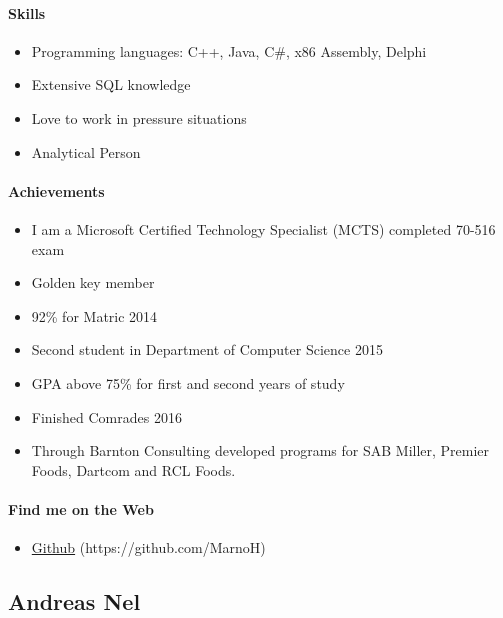 \documentclass{article}
\begin{document}
        \paragraph{Skills}
            \begin{itemize}
                \item Programming languages: C++, Java, C\#, x86 Assembly, Delphi
                \item Extensive SQL knowledge
                \item Love to work in pressure situations
                \item Analytical Person
            \end{itemize}
            
        \paragraph{Achievements}
            \begin{itemize}
                \item I am a Microsoft Certified Technology Specialist (MCTS) completed 70-516 exam
                \item Golden key member
                \item 92\% for Matric 2014
                \item Second student in Department of Computer Science 2015
                \item GPA above 75\% for first and second years of study
                \item Finished Comrades 2016
                \item Through Barnton Consulting developed programs for SAB Miller, Premier Foods, Dartcom and RCL Foods.
            \end{itemize}
            
        \paragraph{Find me on the Web}
            \begin{itemize}
                \item \href{https://github.com/MarnoH}{Github} (https://github.com/MarnoH)
            \end{itemize}

\newpage        
    \subsection{Andreas Nel}
\end{document}
